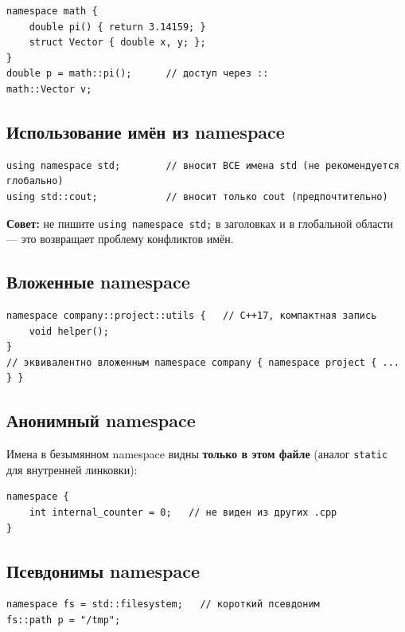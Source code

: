 \begin{lstlisting}
namespace math {
    double pi() { return 3.14159; }
    struct Vector { double x, y; };
}
double p = math::pi();      // доступ через ::
math::Vector v;
\end{lstlisting}

\subsection{Использование имён из namespace}

\begin{lstlisting}
using namespace std;        // вносит ВСЕ имена std (не рекомендуется глобально)
using std::cout;            // вносит только cout (предпочтительно)
\end{lstlisting}

\textbf{Совет:} не пишите \texttt{using namespace std;} в заголовках и в глобальной
области --- это возвращает проблему конфликтов имён.

\subsection{Вложенные namespace}

\begin{lstlisting}
namespace company::project::utils {   // C++17, компактная запись
    void helper();
}
// эквивалентно вложенным namespace company { namespace project { ... } }
\end{lstlisting}

\subsection{Анонимный namespace}

Имена в безымянном namespace видны \textbf{только в этом файле} (аналог
\texttt{static} для внутренней линковки):

\begin{lstlisting}
namespace {
    int internal_counter = 0;   // не виден из других .cpp
}
\end{lstlisting}

\subsection{Псевдонимы namespace}

\begin{lstlisting}
namespace fs = std::filesystem;   // короткий псевдоним
fs::path p = "/tmp";
\end{lstlisting}

